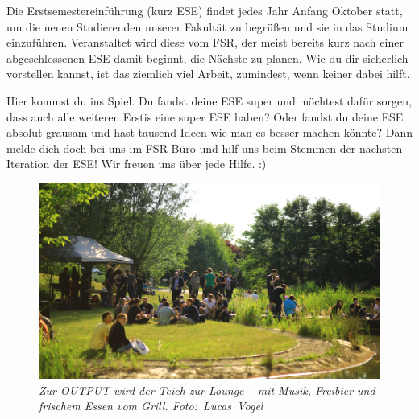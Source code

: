 
Die Erstsemestereinführung (kurz ESE) findet jedes Jahr Anfang Oktober statt, um die neuen Studierenden unserer Fakultät zu begrüßen und sie in das Studium einzuführen.
Veranstaltet wird diese vom FSR, der meist bereits kurz nach einer abgeschlossenen ESE damit beginnt, die Nächste zu planen.
Wie du dir sicherlich vorstellen kannst, ist das ziemlich viel Arbeit, zumindest, wenn keiner dabei hilft.

Hier kommst du ins Spiel. Du fandst deine ESE super und möchtest dafür sorgen, dass auch alle weiteren Erstis eine super ESE haben?
Oder fandst du deine ESE absolut grausam und hast tausend Ideen wie man es besser machen könnte?
Dann melde dich doch bei uns im FSR-Büro und hilf uns beim Stemmen der nächsten Iteration der ESE! Wir freuen uns über jede Hilfe. :)

\begin{figure}[b!]
  \centering
  \includegraphics[width=\linewidth]{img/output_pond}
  \caption*{\small \centering \textit{Zur OUTPUT wird der Teich zur Lounge -- mit Musik, Freibier und frischem Essen vom Grill. Foto:~Lucas~Vogel}}
\end{figure}


